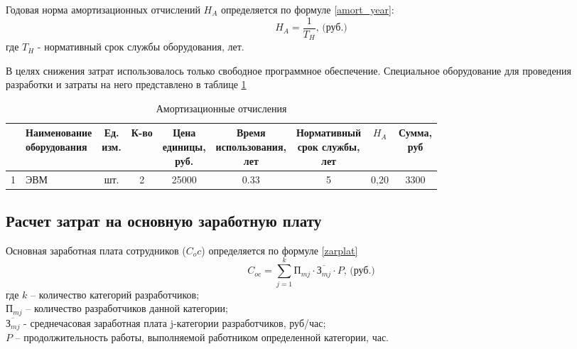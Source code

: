 Годовая норма амортизационных отчислений $H_A$ определяется по формуле \ref{amort_year}:
\begin{equation}
H_A = \frac{1}{T_H}\mbox{, (руб.)}
\label{amort_year}
\end{equation}
где   $T_H$ - нормативный срок службы оборудования, лет. 

В целях снижения затрат использовалось только свободное программное обеспечение. Специальное оборудование для проведения разработки и затраты на него представлено в таблице \ref{amort_items}
\begin{table}[h]
	\caption{Амортизационные отчисления}
	\label{amort_items}
	\begin{tabular}{|l|l|c|c|c|c|c|c|c|}
		\hline
			\No & \thead{Наименование\\оборудования} & \thead{Ед.\\ изм.} & К-во & \thead{Цена\\единицы,\\руб.} & \thead{Время\\ использования,\\ лет} & \thead{Нормативный\\ срок службы,\\ лет} & $H_A$ & \thead{Сумма,\\ руб}\\
		\hline
			1 & ЭВМ & шт. & 2 & 25000 & 0.33 & 5 & 0,20 & 3300 \\
		\hline
	\end{tabular}
\end{table}

\subsection{Расчет затрат на основную заработную плату}
Основная заработная плата сотрудников ($C_oc$) определяется по формуле \ref{zarplat} 
\begin{equation}
	C_{oc} = \sum_{j=1}^k \textit{П}_{mj} \cdot \overline{\textit{З}_{mj}} \cdot P \mbox{, (руб.)}
	\label{zarplat}
\end{equation}
где  $k$ – количество категорий разработчиков;\\
$\textit{П}_{mj}$ – количество разработчиков данной категории;\\
$\overline{\textit{З}_{mj}}$ - среднечасовая заработная плата j-категории разработчиков, руб/час;\\
$P$ – продолжительность работы, выполняемой работником определенной категории, час.

